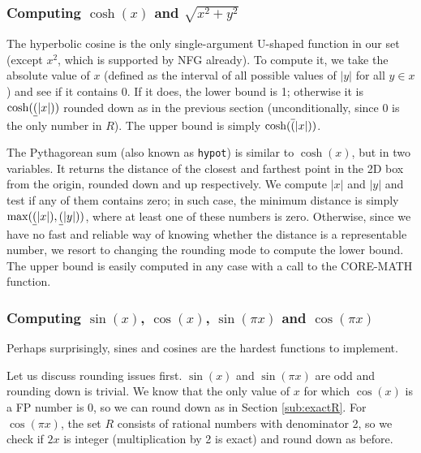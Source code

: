 \subsubsection{Computing $\cosh(x)$ and $\sqrt{x^2+y^2}$}
The hyperbolic cosine is the only single-argument U-shaped function in our set (except $x^2$, which is supported by NFG already). 
To compute it, we take the absolute value of $x$ (defined as the interval of all possible values of $|y|$ for all $y\in x$) and see if it contains 0. 
If it does, the lower bound is 1; otherwise it is $\cosh(\underline{(}|x|))$ rounded down as in the previous section (unconditionally, since 0 is the only number in $R$). The upper bound is simply $\cosh(\overline{(}|x|))$.

The Pythagorean sum (also known as \texttt{hypot}) is similar to $\cosh(x)$, but in two variables. It returns the distance of the closest and farthest point in the 2D box from the origin, rounded down and up respectively.
We compute $|x|$ and $|y|$ and test if any of them contains zero; in such case, the minimum distance is simply $\max(\underline{(}|x|), \underline{(}|y|))$, where at least one of these numbers is zero.
Otherwise, since we have no fast and reliable way of knowing whether the distance is a representable number, we resort to changing the rounding mode to compute the lower bound.
The upper bound is easily computed in any case with a call to the CORE-MATH function.

\subsubsection{Computing $\sin(x)$, $\cos(x)$, $\sin(\pi x)$ and $\cos(\pi x)$}
\label{sub:sincos}
Perhaps surprisingly, sines and cosines are the hardest functions to implement.

Let us discuss rounding issues first. $\sin(x)$ and $\sin(\pi x)$ are odd and rounding down is trivial.
We know that the only value of $x$ for which $\cos(x)$ is a FP number is $0$, so we can round down as in Section \ref{sub:exactR}. 
For $\cos(\pi x)$, the set $R$ consists of rational numbers with denominator 2, so we check if $2x$ is integer (multiplication by 2 is exact) and round down as before.

